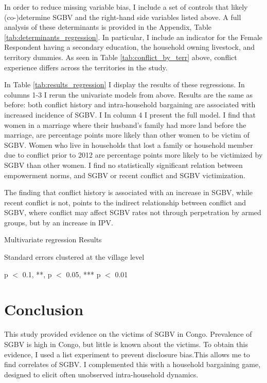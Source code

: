 \documentclass[10pt,a4paper,abstract=on]{scrartcl} %
\begin{document}
In order to reduce missing variable bias, I include a set of controls that likely (co-)determine SGBV and the right-hand side variables listed above. A full analysis of these determinants is provided in the Appendix, Table \ref{tab:determinants_regression}. In particular, I include an indicator for the Female Respondent having a secondary education, the household owning livestock, and territory dummies. As seen in Table \ref{tab:conflict_by_terr} above, conflict experience differs across the territories in the study. 

In Table \ref{tab:results_regression} I display the results of these regressions. In columns 1-3 I rerun the univariate models from above. Results are the same as before: both conflict history and intra-household bargaining are associated with increased incidence of SGBV. I In column 4 I present the full model. I find that women in a marriage where their husband's family had more land before the marriage, are  percentage points more likely than other women to be victim of SGBV. Women who live in households that lost a family or household member due to conflict prior to 2012 are  percentage points more likely to be victimized by SGBV than other women. I find no statistically significant relation between empowerment norms, and SGBV or recent conflict and SGBV victimization.

The finding that conflict history is associated with an increase in SGBV, while recent conflict is not, points to the indirect relationship between conflict and SGBV, where conflict may affect SGBV rates not through perpetration by armed groups, but by an increase in IPV.

\begin{threeparttable}
	\caption{Multivariate regression Results}\label{tab:results_regression}
	\begin{center}
	
	
	\begin{tablenotes}
	\small
	 \item Standard errors clustered at the village level
	 \item * p $<$ 0.1, **, p $<$ 0.05, *** p $<$ 0.01
	\end{tablenotes}
	\end{center}
\end{threeparttable}

\section*{Conclusion}
This study provided evidence on the victims of SGBV in Congo. Prevalence of SGBV is high in Congo, but little is known about the victims. To obtain this evidence, I used a list experiment to prevent disclosure bias.This allows me to find correlates of SGBV. I complemented this with a household bargaining game, designed to elicit often unobserved intra-household dynamics.
\end{document}
